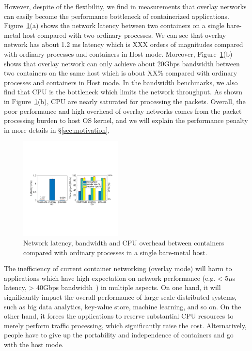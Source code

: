 However, despite of the flexibility, we find in measurements that overlay
networks can easily become the performance bottleneck of containerized
applications. 
Figure~\ref{fig:intro-exist}(a) shows the network latency between two containers
on a single bare-metal host compared with two ordinary processes. 
We can see that overlay network has about 1.2 ms latency which is XXX orders
of magnitudes compared with ordinary processes and containers in Host mode.
Moreover, Figure~\ref{fig:intro-exist}(b) shows that overlay network can only
achieve about 20Gbps bandwidth between two containers on the same host 
which is about XX\% compared with ordinary processes and containers in Host mode.
In the bandwidth benchmarks, we also find that CPU is the bottleneck which 
limits the network throughput. As shown in Figure~\ref{fig:intro-exist}(b),
CPU are nearly saturated for processing the packets. Overall, the poor
performance and high overhead of overlay networks comes from the packet processing
burden to host OS kernel, and we will explain the performance penalty in more details in \S\ref{sec:motivation},
 

\begin{figure}[t!]
     \centering 
     \includegraphics[width=0.46\textwidth]{figures/intro/intro_exist2.pdf} 
     \caption{Network latency, bandwidth and CPU overhead between containers compared with ordinary processes in a single bare-metal host. }
     \label{fig:intro-exist}
\end{figure} 

The inefficiency of current container networking (overlay mode) 
will harm to applications which have high expectation  on network performance (e.g. < 5$\mu$s latency, > 40Gbps bandwidth~\cite{?}) in multiple aspects. 
On one hand,
it will significantly impact the overall performance of large scale distributed systems, such as big data analytics, key-value store, machine learning, and so on. On the other hand, it forces the applications to reserve substantial CPU
resources to merely perform traffic processing, which significantly raise the 
cost. Alternatively, people have to give up the portability and independence
of containers and go with the host mode. 

